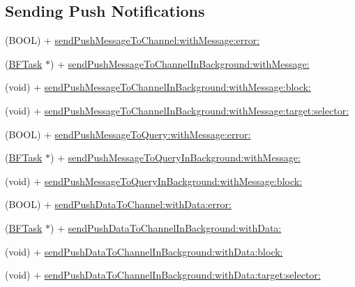 \subsection*{Sending Push Notifications}
\label{_amgrpe6cb0893a72c17d8c8a97bd50a4bf421}%


 

 \begin{DoxyCompactItemize}
\item 
(B\+O\+O\+L) + \hyperlink{interface_p_f_push_a32b6cd45775490ec9b0e6fcc4e74744f}{send\+Push\+Message\+To\+Channel\+:with\+Message\+:error\+:}
\item 
(\hyperlink{interface_b_f_task}{B\+F\+Task} $\ast$) + \hyperlink{interface_p_f_push_a65afdd37ae139e6c507bbd09e848b91a}{send\+Push\+Message\+To\+Channel\+In\+Background\+:with\+Message\+:}
\item 
(void) + \hyperlink{interface_p_f_push_a2b32857be566b43fcdd3f96a666dbca8}{send\+Push\+Message\+To\+Channel\+In\+Background\+:with\+Message\+:block\+:}
\item 
(void) + \hyperlink{interface_p_f_push_a88439fa875385d01f26b974278a402ab}{send\+Push\+Message\+To\+Channel\+In\+Background\+:with\+Message\+:target\+:selector\+:}
\item 
(B\+O\+O\+L) + \hyperlink{interface_p_f_push_a3348f305a53a118f750c53a4d22983a7}{send\+Push\+Message\+To\+Query\+:with\+Message\+:error\+:}
\item 
(\hyperlink{interface_b_f_task}{B\+F\+Task} $\ast$) + \hyperlink{interface_p_f_push_ad0acb79c0e6439daf37e1e22d524134a}{send\+Push\+Message\+To\+Query\+In\+Background\+:with\+Message\+:}
\item 
(void) + \hyperlink{interface_p_f_push_add921b3ff333dad017c1ee8490b3d1ad}{send\+Push\+Message\+To\+Query\+In\+Background\+:with\+Message\+:block\+:}
\item 
(B\+O\+O\+L) + \hyperlink{interface_p_f_push_a0c6261c565e9289076fdffd6f14b66f6}{send\+Push\+Data\+To\+Channel\+:with\+Data\+:error\+:}
\item 
(\hyperlink{interface_b_f_task}{B\+F\+Task} $\ast$) + \hyperlink{interface_p_f_push_a033c034c9895d32caa0b57ca6bc45ef7}{send\+Push\+Data\+To\+Channel\+In\+Background\+:with\+Data\+:}
\item 
(void) + \hyperlink{interface_p_f_push_ac2741d4da328547f80b5309b6c569e0a}{send\+Push\+Data\+To\+Channel\+In\+Background\+:with\+Data\+:block\+:}
\item 
(void) + \hyperlink{interface_p_f_push_a183974b28ab6e7f22edcf9b57e5ecb98}{send\+Push\+Data\+To\+Channel\+In\+Background\+:with\+Data\+:target\+:selector\+:}

\end{DoxyCompactItemize}
